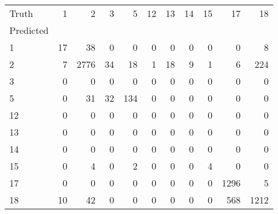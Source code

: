 \begin{tabular}{lrrrrrrrrrr}
\toprule
Truth & 1 & 2 & 3 & 5 & 12 & 13 & 14 & 15 & 17 & 18 \\
Predicted &  &  &  &  &  &  &  &  &  &  \\
\midrule
1 & 17 & 38 & 0 & 0 & 0 & 0 & 0 & 0 & 0 & 8 \\
2 & 7 & 2776 & 34 & 18 & 1 & 18 & 9 & 1 & 6 & 224 \\
3 & 0 & 0 & 0 & 0 & 0 & 0 & 0 & 0 & 0 & 0 \\
5 & 0 & 31 & 32 & 134 & 0 & 0 & 0 & 0 & 0 & 0 \\
12 & 0 & 0 & 0 & 0 & 0 & 0 & 0 & 0 & 0 & 0 \\
13 & 0 & 0 & 0 & 0 & 0 & 0 & 0 & 0 & 0 & 0 \\
14 & 0 & 0 & 0 & 0 & 0 & 0 & 0 & 0 & 0 & 0 \\
15 & 0 & 4 & 0 & 2 & 0 & 0 & 0 & 4 & 0 & 0 \\
17 & 0 & 0 & 0 & 0 & 0 & 0 & 0 & 0 & 1296 & 5 \\
18 & 10 & 42 & 0 & 0 & 0 & 0 & 0 & 0 & 568 & 1212 \\
\bottomrule
\end{tabular}
